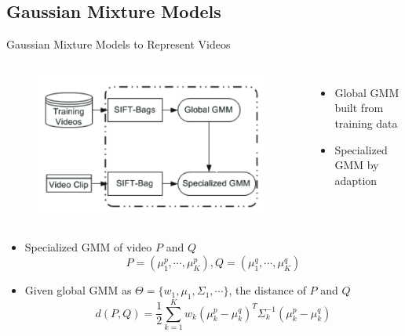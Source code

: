 \subsection{Gaussian Mixture Models}
\begin{frame}{Gaussian Mixture Models to Represent Videos \cite{zhou2008sift}}

\begin{columns}
			\begin{figure}[!ht]
				\centering
					\includegraphics[scale=0.2]{./gmm.png}
				\end{figure}		

		\begin{itemize}
			\item Global GMM built from training data
			\item Specialized GMM by adaption
		\end{itemize}
\end{columns}

\begin{itemize}
	\item Specialized GMM of video $P$ and $Q$
		$$P = (\mu_1^p, \cdots, \mu_K^p), Q = (\mu_1^q, \cdots, \mu_K^q)$$
	\item Given global GMM as $\Theta = \{w_1, \mu_1, \Sigma_1, \cdots\}$, the distance of $P$ and $Q$
	\begin{equation}
	d(P,Q) = \frac{1}{2} \sum_{k= 1}^{K} w_k (\mu_k^p - \mu_k^q)^T \Sigma_k^{-1} (\mu_k^p - \mu_k^q)
	\end{equation}
\end{itemize}

\end{frame}

